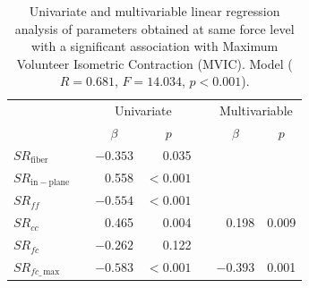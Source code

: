\begin{table}[!htb]
\vspace{+0.2cm}
\caption[Univariate and multivariable linear regression analysis of parameters obtained at force peak with maximum volunteer isometric contraction]{Univariate and multivariable linear regression analysis of parameters obtained at same force level with a significant association with Maximum Volunteer Isometric Contraction (MVIC). Model ($R=0.681$, $F=14.034$, $p<0.001$).}
\label{tab: SR2_3}
\begin{center}
\begin{tabular}{@{}llrrrrr@{}}
\toprule[1pt]\midrule[0.3pt]
               && \multicolumn{2}{c}{Univariate} &  & \multicolumn{2}{c}{Multivariable} \\ \cmidrule(lr){3-4} \cmidrule(lr){6-7}
               && \multicolumn{1}{c}{$\beta$}     & \multicolumn{1}{c}{$p$}            &  & \multicolumn{1}{c}{$\beta$}       & \multicolumn{1}{c}{$p$}              \\ \midrule
$SR_{\mathrm{fiber}}$       & & $-0.353$   & 0.035              &  &            &                     \\ [2pt]
$SR_{\mathrm{in-plane}}$    & & 0.558    & $<0.001$   &  &            & 		                \\ [2pt]
$SR_{ff}$   				& & $-0.554$   & $<0.001$   &  &            &                     \\ [2pt]
$SR_{cc}$ 			   		& & 0.465    & 0.004			  	  &  & 	0.198	  &   0.009             \\ [2pt]
$SR_{fc}$  					& & $-0.262$   & 0.122              &  &            &                     \\ [2pt]
$SR_{fc\_\,\mathrm{max}}$   & & $-0.583$   & $<0.001$   &  &  $-0.393$    &   0.001  			\\ \midrule[0.3pt]\bottomrule[1pt]
\end{tabular}
\end{center}
\vspace{-0.2cm}
\end{table}
%
%
%
